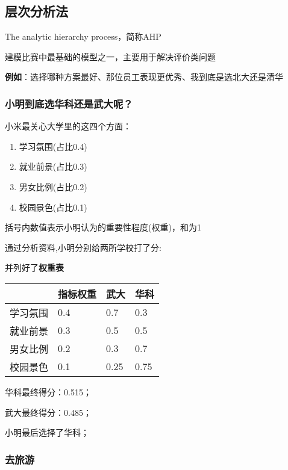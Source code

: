 \documentclass[
]{article}
\author{}
\date{}
\begin{document}
\hypertarget{ux5c42ux6b21ux5206ux6790ux6cd5}{%
\subsection{层次分析法}\label{ux5c42ux6b21ux5206ux6790ux6cd5}}

The analytic hierarchy process，简称AHP

建模比赛中最基础的模型之一，主要用于解决评价类问题

\textbf{例如}：选择哪种方案最好、那位员工表现更优秀、我到底是选北大还是清华

\hypertarget{ux5c0fux660eux5230ux5e95ux9009ux534eux79d1ux8fd8ux662fux6b66ux5927ux5462}{%
\subsubsection{小明到底选华科还是武大呢？}\label{ux5c0fux660eux5230ux5e95ux9009ux534eux79d1ux8fd8ux662fux6b66ux5927ux5462}}

小米最关心大学里的这四个方面：

\begin{enumerate}
\def\labelenumi{\arabic{enumi}.}
\item
  学习氛围(占比0.4)
\item
  就业前景(占比0.3)
\item
  男女比例(占比0.2)
\item
  校园景色(占比0.1)
\end{enumerate}

括号内数值表示小明认为的重要性程度(权重)，和为1

通过分析资料,小明分别给两所学校打了分:

并列好了\textbf{权重表}

\begin{longtable}[]{@{}llll@{}}
\toprule
& 指标权重 & 武大 & 华科\tabularnewline
\midrule
\endhead
学习氛围 & 0.4 & 0.7 & 0.3\tabularnewline
就业前景 & 0.3 & 0.5 & 0.5\tabularnewline
男女比例 & 0.2 & 0.3 & 0.7\tabularnewline
校园景色 & 0.1 & 0.25 & 0.75\tabularnewline
\bottomrule
\end{longtable}

华科最终得分：0.515；

武大最终得分：0.485；

小明最后选择了华科；

\hypertarget{ux53bbux65c5ux6e38}{%
\subsubsection{去旅游}\label{ux53bbux65c5ux6e38}}
\end{document}
